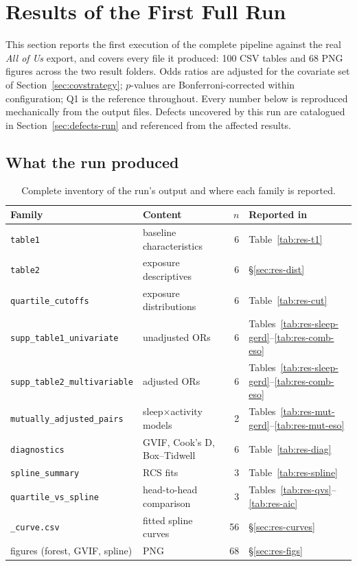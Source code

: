 \documentclass[11pt]{article}
\newcommand{\code}[1]{\texttt{\small #1}}
\begin{document}
\section{Results of the First Full Run}
\label{sec:results}
This section reports the first execution of the complete pipeline against the real
\textit{All of Us} export, and covers every file it produced: 100 CSV tables and 68 PNG figures
across the two result folders. Odds ratios are adjusted for the covariate set of
Section~\ref{sec:covstrategy}; $p$-values are Bonferroni-corrected within configuration; Q1 is the
reference throughout. Every number below is reproduced mechanically from the output files.
Defects uncovered by this run are catalogued in Section~\ref{sec:defects-run} and referenced from
the affected results.

\subsection{What the run produced}
\begin{table}[h]
\centering
\footnotesize
\begin{tabular}{@{}llrl@{}}
\toprule
\textbf{Family} & \textbf{Content} & \textbf{$n$} & \textbf{Reported in} \\
\midrule
\code{table1}                    & baseline characteristics     & 6  & Table~\ref{tab:res-t1} \\
\code{table2}                    & exposure descriptives        & 6  & \S\ref{sec:res-dist} \\
\code{quartile_cutoffs}          & exposure distributions       & 6  & Table~\ref{tab:res-cut} \\
\code{supp_table1_univariate}    & unadjusted ORs               & 6  & Tables~\ref{tab:res-sleep-gerd}--\ref{tab:res-comb-eso} \\
\code{supp_table2_multivariable} & adjusted ORs                 & 6  & Tables~\ref{tab:res-sleep-gerd}--\ref{tab:res-comb-eso} \\
\code{mutually_adjusted_pairs}   & sleep$\times$activity models & 2  & Tables~\ref{tab:res-mut-gerd}--\ref{tab:res-mut-eso} \\
\code{diagnostics}               & GVIF, Cook's D, Box--Tidwell & 6  & Table~\ref{tab:res-diag} \\
\code{spline_summary}            & RCS fits                     & 3  & Table~\ref{tab:res-spline} \\
\code{quartile_vs_spline}        & head-to-head comparison      & 3  & Tables~\ref{tab:res-qvs}--\ref{tab:res-aic} \\
\code{*_curve.csv}               & fitted spline curves         & 56 & \S\ref{sec:res-curves} \\
figures (forest, GVIF, spline)   & PNG                          & 68 & \S\ref{sec:res-figs} \\
\bottomrule
\end{tabular}
\caption{Complete inventory of the run's output and where each family is reported.}
\end{table}
\end{document}
